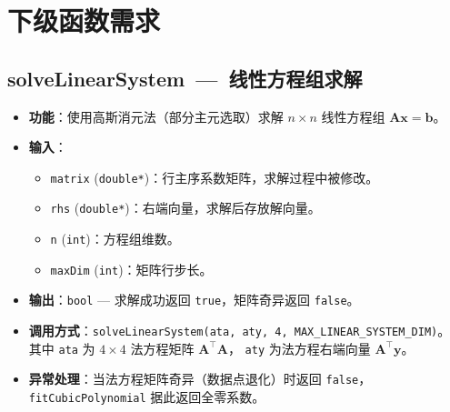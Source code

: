 \documentclass[a4paper,10pt]{article}
\begin{document}
\begin{center}
\end{center}

\section{下级函数需求}

\subsection{solveLinearSystem~---~线性方程组求解}

\begin{itemize}
  \item \textbf{功能}：使用高斯消元法（部分主元选取）求解 $n \times n$ 线性方程组 $\mathbf{A}\mathbf{x} = \mathbf{b}$。
  \item \textbf{输入}：
    \begin{itemize}
      \item \texttt{matrix} (\texttt{double*})：行主序系数矩阵，求解过程中被修改。
      \item \texttt{rhs} (\texttt{double*})：右端向量，求解后存放解向量。
      \item \texttt{n} (\texttt{int})：方程组维数。
      \item \texttt{maxDim} (\texttt{int})：矩阵行步长。
    \end{itemize}
  \item \textbf{输出}：\texttt{bool} --- 求解成功返回 \texttt{true}，矩阵奇异返回 \texttt{false}。
  \item \textbf{调用方式}：\texttt{solveLinearSystem(ata, aty, 4, MAX\_LINEAR\_SYSTEM\_DIM)}。
    其中 \texttt{ata} 为 $4 \times 4$ 法方程矩阵 $\mathbf{A}^{\!\top}\!\mathbf{A}$，
    \texttt{aty} 为法方程右端向量 $\mathbf{A}^{\!\top}\!\mathbf{y}$。
  \item \textbf{异常处理}：当法方程矩阵奇异（数据点退化）时返回 \texttt{false}，
    \texttt{fitCubicPolynomial} 据此返回全零系数。
\end{itemize}
\end{document}
